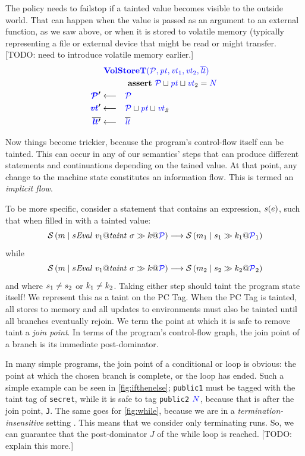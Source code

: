 \documentclass[acmsmall,review,anonymous]{acmart}\settopmatter{printfolios=true,printccs=false,printacmref=false}
\begin{document}
The policy needs to failstop if a tainted value becomes visible to the outside world.
That can happen when the value is passed as an argument to an external function, as we
saw above, or when it is stored to volatile memory (typically representing a file or external
device that might be read or might transfer. [TODO: need to introduce volatile memory earlier.]
%
\[\begin{aligned}
\truledef{\volstoret}
\assert{\PCT \sqcup \pt \sqcup \vt_2 = \N}
\settag{\PCT'}{\PCT}
\settag{\vt'}{\PCT \sqcup \pt \sqcup \vt_2}
\settag{\overline{\lt'}}{\overline{\lt}}
\end{aligned}\]

Now things become trickier, because the program's control-flow itself can be tainted.
This can occur in any of our semantics' steps that can produce different statements and continuations
depending on the tained value. At that point, any change to the machine state constitutes
an information flow. This is termed an {\em implicit flow}.

To be more specific, consider a statement that contains an expression, \(s(e)\),
such that when filled in with a tainted value:
%
\[\mathcal{S}\left(m \mid s\mathit{Eval} ~ v_1@\mathit{taint} ~ \sigma \gg k @ \mathcal{\color{blue} P}\right) \longrightarrow
\mathcal{S}\left(m_1 \mid s_1 \gg k_1 @ \mathcal{\color{blue} P}_1\right)\]
%
while
%
\[\mathcal{S}\left(m \mid s\mathit{Eval} ~ v_1@\mathit{taint} ~ \sigma \gg k @ \mathcal{\color{blue} P}\right) \longrightarrow
\mathcal{S}\left(m_2 \mid s_2 \gg k_2 @ \mathcal{\color{blue} P}_2\right)\]
%
and where \(s_1 \not = s_2\) or \(k_1 \not = k_2\). Taking either step
should taint the program state itself! We represent this as a taint on the PC Tag.
When the PC Tag is tainted, all stores to memory and all updates to environments must
also be tainted until all branches eventually rejoin.
We term the point at which it is safe to remove taint a {\it join point}.
In terms of the program's control-flow graph, the
join point of a branch is its immediate post-dominator.

In many simple programs, the join point of a conditional or loop is obvious:
the point at which the chosen branch is complete, or the loop has ended.
Such a simple example can be seen in \cref{fig:ifthenelse}; {\tt public1} must be
tagged with the taint tag of {\tt secret}, while it is safe to tag {\tt public2}
\({\color{blue} N}\), because that is after the join point, {\tt J}. The same goes for \cref{fig:while},
because we are in a {\em termination-insensitive} setting \cite{}. This means that we
consider only terminating runs. So, we can guarantee that the post-dominator \(J\)
of the while loop is reached. [TODO: explain this more.]
\end{document}
